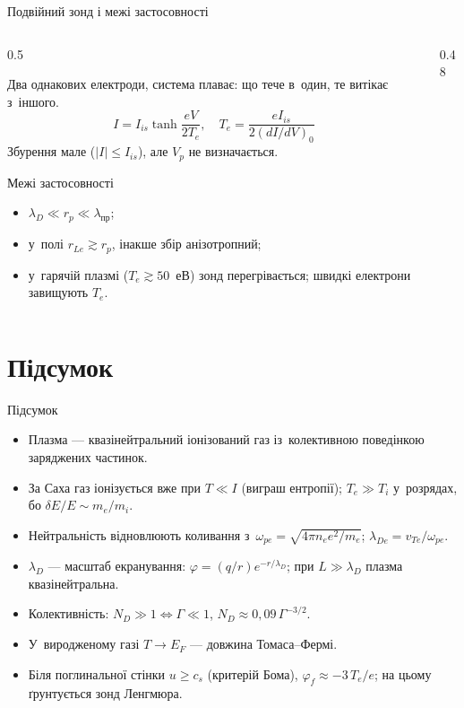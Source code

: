 \documentclass[]{beamer}
\newcommand{\figw}[1]{\resizebox{\linewidth}{!}{\begin{minipage}{11cm}\centering\end{minipage}}}
\begin{document}
\begin{frame}{Подвійний зонд і межі застосовності}
	\begin{columns}[T]
		\begin{column}{0.5\linewidth}
			\begin{block}{}\justifying\scriptsize
				Два однакових електроди, система плаває: що тече в~один, те витікає з~іншого.
				\begin{equation*}
					I=I_{is}\tanh\frac{eV}{2T_e},\quad T_e=\frac{eI_{is}}{2(dI/dV)_{0}}
				\end{equation*}
				Збурення мале ($|I|\le I_{is}$), але $V_p$ не визначається.
			\end{block}
			\begin{alertblock}{Межі застосовності}\justifying\tiny
				\begin{itemize}
					\item $\lambda_D\ll r_p\ll\lambda_{\mathrm{пр}}$;
					\item у~полі $r_{Le}\gtrsim r_p$, інакше збір анізотропний;
					\item у~гарячій плазмі ($T_e\gtrsim50$~еВ) зонд перегрівається; швидкі електрони завищують $T_e$.
				\end{itemize}
			\end{alertblock}
		\end{column}
		\begin{column}{0.48\linewidth}
			\figw{double-probe.tikz}
		\end{column}
	\end{columns}
\end{frame}

\section{Підсумок}

\begin{frame}{Підсумок}
	\begin{itemize}\justifying\small
		\item Плазма --- квазінейтральний іонізований газ із~колективною поведінкою заряджених частинок.
		\item За Саха газ іонізується вже при $T\ll I$ (виграш ентропії); $T_e\gg T_i$ у~розрядах, бо $\delta E/E\sim m_e/m_i$.
		\item Нейтральність відновлюють коливання з~$\omega_{pe}=\sqrt{4\pi n_ee^2/m_e}$; $\lambda_{De}=v_{Te}/\omega_{pe}$.
		\item $\lambda_D$ --- масштаб екранування: $\varphi=(q/r)e^{-r/\lambda_D}$; при $L\gg\lambda_D$ плазма квазінейтральна.
		\item Колективність: $N_D\gg1\Leftrightarrow\Gamma\ll1$, $N_D\approx0{,}09\,\Gamma^{-3/2}$.
		\item У~виродженому газі $T\to E_F$ --- довжина Томаса--Фермі.
		\item Біля поглинальної стінки $u\ge c_s$ (критерій Бома), $\varphi_f\approx-3\,T_e/e$; на цьому ґрунтується зонд Ленгмюра.
	\end{itemize}
\end{frame}
\end{document}
